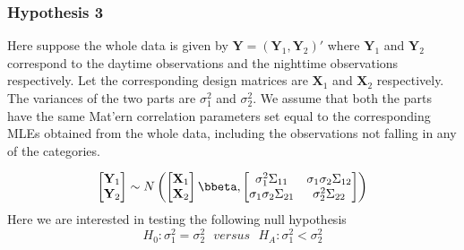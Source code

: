 \documentclass[]{article}
\begin{document}
\subsubsection{Hypothesis 3}

Here suppose the whole data is given by \(\mathbf{Y} = (\mathbf{Y}_1, \mathbf{Y}_2)'\) where \(\mathbf{Y}_1\) and \(\mathbf{Y}_2\) correspond to the daytime observations and the nighttime observations respectively. Let the corresponding design matrices are \(\mathbf{X}_1\) and \(\mathbf{X}_2\) respectively. The variances of the two parts are \(\sigma_1^2\) and \(\sigma_2^2\). We assume that both the parts have the same Mat'ern correlation parameters set equal to the corresponding MLEs obtained from the whole data, including the observations not falling in any of the categories.

\[
\begin{bmatrix}
    \mathbf{Y}_1 \\
    \mathbf{Y}_2
\end{bmatrix}
\sim N \left(
\begin{bmatrix}
    \mathbf{X}_1 \\
    \mathbf{X}_2
\end{bmatrix}
\bbeta, 
\begin{bmatrix}
    \sigma_1^2 \Sigma_{11} & \sigma_1 \sigma_2  \Sigma_{12} \\
    \sigma_1 \sigma_2 \Sigma_{21} & \sigma_2^2 \Sigma_{22}
\end{bmatrix}
 \right)
\]
Here we are interested in testing the following null hypothesis
\[H_0: \sigma_1^2 = \sigma_2^2 ~~~ versus~~~ H_A: \sigma_1^2 < \sigma_2^2\]
\end{document}
